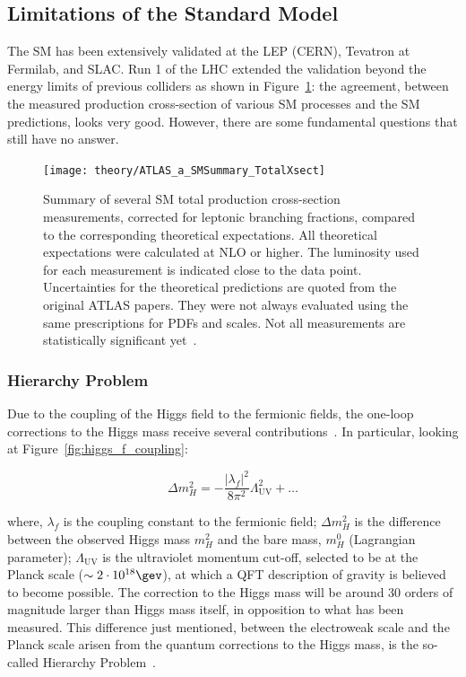 		\subsection{Limitations of the Standard Model}
		\label{sec:SMlim}

			The \ac{SM} has been extensively validated at the \ac{LEP} (\ac{CERN}), Tevatron at Fermilab, and SLAC. Run 1 of the \ac{LHC} extended the validation beyond the energy limits of previous colliders as shown in Figure~\ref{fig:ATLAS_a_SMSummary_TotalXsect}: the agreement, between the measured production cross-section of various \ac{SM} processes and the \ac{SM} predictions, looks very good. However, there are some fundamental questions that still have no answer.

			\begin{figure}[!htb]
				\centering
				\texttt{[image: theory/ATLAS\_a\_SMSummary\_TotalXsect]}
				\caption{\label{fig:ATLAS_a_SMSummary_TotalXsect} Summary of several \ac{SM} total production cross-section measurements, corrected for leptonic branching fractions, compared to the corresponding theoretical expectations. All theoretical expectations were calculated at NLO or higher. The luminosity used for each measurement is indicated close to the data point. Uncertainties for the theoretical predictions are quoted from the original ATLAS papers. They were not always evaluated using the same prescriptions for PDFs and scales. Not all measurements are statistically significant yet~\cite{ATLAS_a_SMSummary_TotalXsect}.}
			\end{figure}



		\subsubsection*{Hierarchy Problem}

			Due to the coupling of the Higgs field to the fermionic fields, the one-loop corrections to the Higgs mass receive several contributions~\cite{Weinberg1976}. In particular, looking at Figure~\ref{fig:higgs_f_coupling}: 

			\begin{equation}
				\label{eq:mH_fermionic_contribution}
				\Delta m_H^2 = - \frac{ | \lambda_f  |^2}{8 \pi ^2} \Lambda_{\mathrm{UV}}^2 + \dots 
			\end{equation}
 	
			\noindent where, $\lambda_f$ is the coupling constant to the fermionic field; $\Delta m_H^2$ is the difference between the observed Higgs mass $m_H^2$ and the bare mass, $m_H^0$ (Lagrangian parameter); $\Lambda_{\mathrm{UV}}$ is the ultraviolet momentum cut-off, selected to be at the Planck scale ($\sim 2 \cdot 10^{18} \gev$), at which a \ac{QFT} description of gravity is believed to become possible. The correction to the Higgs mass will be around 30 orders of magnitude larger than Higgs mass itself, in opposition to what has been measured. This difference just mentioned, between the electroweak scale and the Planck scale arisen from the quantum corrections to the Higgs mass, is the so-called Hierarchy Problem~\cite{Weinberg1976}.

